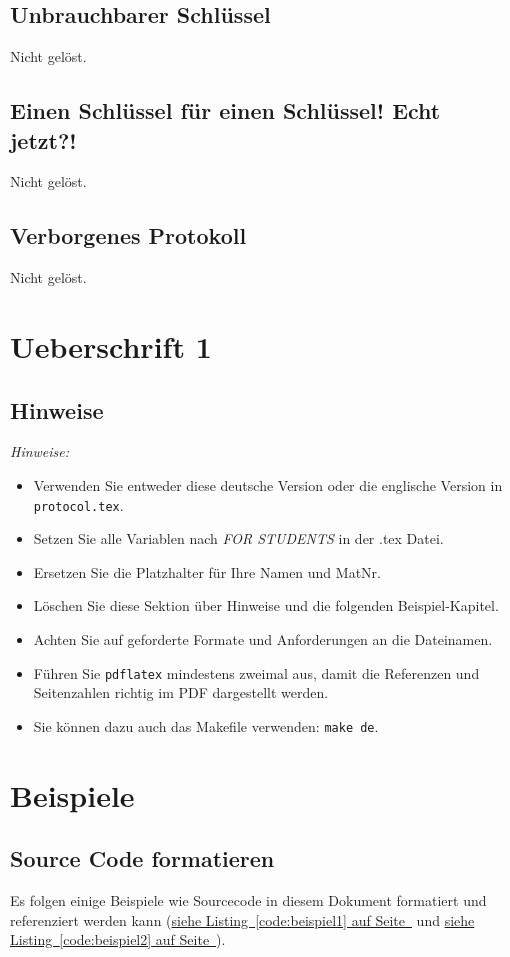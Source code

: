 \documentclass[12pt,a4paper,titlepage,oneside]{scrartcl}
\begin{document}
\subsection{Unbrauchbarer Schl\"ussel}
Nicht gelöst.

\subsection{Einen Schl\"ussel f\"ur einen Schl\"ussel! Echt jetzt?!}
Nicht gelöst.

\subsection{Verborgenes Protokoll}
Nicht gelöst.



\section{Ueberschrift 1}

\subsection{Hinweise}
\emph{Hinweise:}
\begin{itemize}
    \item Verwenden Sie entweder diese deutsche Version oder die englische Version in \lstinline{protocol.tex}.
    \item Setzen Sie alle Variablen nach \emph{FOR STUDENTS} in der .tex Datei.
    \item Ersetzen Sie die Platzhalter für Ihre Namen und MatNr.
    \item Löschen Sie diese Sektion über Hinweise und die folgenden Beispiel-Kapitel.
    \item Achten Sie auf geforderte Formate und Anforderungen an die Dateinamen.
    \item Führen Sie \lstinline{pdflatex} mindestens zweimal aus, damit die Referenzen und Seitenzahlen richtig im PDF dargestellt werden.
    \item Sie können dazu auch das Makefile verwenden: \lstinline{make de}.
\end{itemize}

\section{Beispiele}

\subsection{Source Code formatieren}
Es folgen einige Beispiele wie Sourcecode in diesem Dokument formatiert und referenziert werden kann
(\hyperref[code:beispiel1]{siehe Listing~\ref*{code:beispiel1} auf Seite~\pageref*{code:beispiel1}} und \hyperref[code:beispiel2]{siehe Listing~\ref*{code:beispiel2} auf Seite~\pageref*{code:beispiel2}}).
\end{document}
